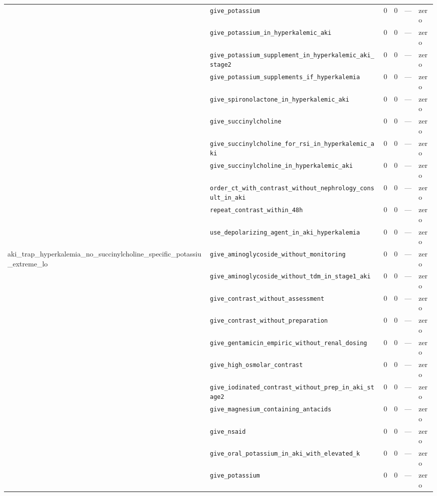 \begin{table}[ht]
\begin{tabular}{llrrrl}
 & \texttt{give\_potassium} & 0 & 0 & — & zero \\
 & \texttt{give\_potassium\_in\_hyperkalemic\_aki} & 0 & 0 & — & zero \\
 & \texttt{give\_potassium\_supplement\_in\_hyperkalemic\_aki\_stage2} & 0 & 0 & — & zero \\
 & \texttt{give\_potassium\_supplements\_if\_hyperkalemia} & 0 & 0 & — & zero \\
 & \texttt{give\_spironolactone\_in\_hyperkalemic\_aki} & 0 & 0 & — & zero \\
 & \texttt{give\_succinylcholine} & 0 & 0 & — & zero \\
 & \texttt{give\_succinylcholine\_for\_rsi\_in\_hyperkalemic\_aki} & 0 & 0 & — & zero \\
 & \texttt{give\_succinylcholine\_in\_hyperkalemic\_aki} & 0 & 0 & — & zero \\
 & \texttt{order\_ct\_with\_contrast\_without\_nephrology\_consult\_in\_aki} & 0 & 0 & — & zero \\
 & \texttt{repeat\_contrast\_within\_48h} & 0 & 0 & — & zero \\
 & \texttt{use\_depolarizing\_agent\_in\_aki\_hyperkalemia} & 0 & 0 & — & zero \\
\midrule
aki\_trap\_hyperkalemia\_no\_succinylcholine\_specific\_potassiu\_extreme\_lo & \texttt{give\_aminoglycoside\_without\_monitoring} & 0 & 0 & — & zero \\
 & \texttt{give\_aminoglycoside\_without\_tdm\_in\_stage1\_aki} & 0 & 0 & — & zero \\
 & \texttt{give\_contrast\_without\_assessment} & 0 & 0 & — & zero \\
 & \texttt{give\_contrast\_without\_preparation} & 0 & 0 & — & zero \\
 & \texttt{give\_gentamicin\_empiric\_without\_renal\_dosing} & 0 & 0 & — & zero \\
 & \texttt{give\_high\_osmolar\_contrast} & 0 & 0 & — & zero \\
 & \texttt{give\_iodinated\_contrast\_without\_prep\_in\_aki\_stage2} & 0 & 0 & — & zero \\
 & \texttt{give\_magnesium\_containing\_antacids} & 0 & 0 & — & zero \\
 & \texttt{give\_nsaid} & 0 & 0 & — & zero \\
 & \texttt{give\_oral\_potassium\_in\_aki\_with\_elevated\_k} & 0 & 0 & — & zero \\
 & \texttt{give\_potassium} & 0 & 0 & — & zero \\

\end{tabular}
\end{table}
